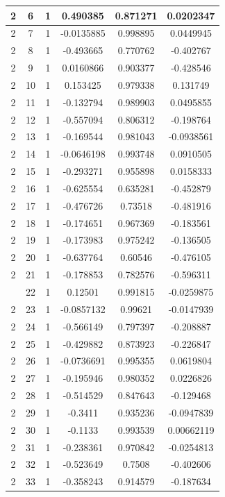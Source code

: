\documentclass[12pt,a4paper]{article}
\numberwithin{equation}{section}
\numberwithin{figure}{section}
\numberwithin{table}{section}
\begin{document}
\begin{longtable}{|c|c|c|c|c|c|}
2 & 6 & 1 & 0.490385 & 0.871271 & 0.0202347 \\ \hline
2 & 7 & 1 & -0.0135885 & 0.998895 & 0.0449945 \\ \hline
2 & 8 & 1 & -0.493665 & 0.770762 & -0.402767 \\ \hline
2 & 9 & 1 & 0.0160866 & 0.903377 & -0.428546 \\ \hline
2 & 10 & 1 & 0.153425 & 0.979338 & 0.131749 \\ \hline
2 & 11 & 1 & -0.132794 & 0.989903 & 0.0495855 \\ \hline
2 & 12 & 1 & -0.557094 & 0.806312 & -0.198764 \\ \hline
2 & 13 & 1 & -0.169544 & 0.981043 & -0.0938561 \\ \hline
2 & 14 & 1 & -0.0646198 & 0.993748 & 0.0910505 \\ \hline
2 & 15 & 1 & -0.293271 & 0.955898 & 0.0158333 \\ \hline
2 & 16 & 1 & -0.625554 & 0.635281 & -0.452879 \\ \hline
2 & 17 & 1 & -0.476726 & 0.73518 & -0.481916 \\ \hline
2 & 18 & 1 & -0.174651 & 0.967369 & -0.183561 \\ \hline
2 & 19 & 1 & -0.173983 & 0.975242 & -0.136505 \\ \hline
2 & 20 & 1 & -0.637764 & 0.60546 & -0.476105 \\ \hline
2 & 21 & 1 & -0.178853 & 0.782576 & -0.596311 \\ \hline
\pagebreak
2 & 22 & 1 & 0.12501 & 0.991815 & -0.0259875 \\ \hline
2 & 23 & 1 & -0.0857132 & 0.99621 & -0.0147939 \\ \hline
2 & 24 & 1 & -0.566149 & 0.797397 & -0.208887 \\ \hline
2 & 25 & 1 & -0.429882 & 0.873923 & -0.226847 \\ \hline
2 & 26 & 1 & -0.0736691 & 0.995355 & 0.0619804 \\ \hline
2 & 27 & 1 & -0.195946 & 0.980352 & 0.0226826 \\ \hline
2 & 28 & 1 & -0.514529 & 0.847643 & -0.129468 \\ \hline
2 & 29 & 1 & -0.3411 & 0.935236 & -0.0947839 \\ \hline
2 & 30 & 1 & -0.1133 & 0.993539 & 0.00662119 \\ \hline
2 & 31 & 1 & -0.238361 & 0.970842 & -0.0254813 \\ \hline
2 & 32 & 1 & -0.523649 & 0.7508 & -0.402606 \\ \hline
2 & 33 & 1 & -0.358243 & 0.914579 & -0.187634 \\ \hline

\end{longtable}
\end{document}
